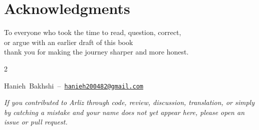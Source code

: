 \chapter*{Acknowledgments}
\thispagestyle{empty}

\vspace*{1cm}

\begin{center}
	\large
	To everyone who took the time to read, question, correct,\\
	or argue with an earlier draft of this book\\
	thank you for making the journey sharper and more honest.
\end{center}

\vspace{0.6cm}

\begingroup
\footnotesize
\setlength{\parindent}{0pt}
\setlength{\parskip}{0pt}
\setlength{\columnsep}{1.2em}

\begin{multicols}{2}
	\raggedright
	\raggedcolumns
	\newcommand{\AckEmail}[2]{\mbox{#1 -- \href{mailto:#2}{\texttt{#2}}}\par}
	\newcommand{\AckGitHub}[2]{\mbox{#1 -- \href{#2}{\texttt{#2}}}\par}
	\newcommand{\AckName}[1]{\mbox{#1}\par}
	
	\AckEmail{Hanieh Bakhshi}{hanieh200482@gmail.com}
	
\end{multicols}
\endgroup

\vfill

\begin{center}
	\small\textit{
		If you contributed to Arliz through code, review, discussion, translation,
		or simply by catching a mistake and your name does not yet appear here,
		please open an issue or pull request.
	}
\end{center}

\clearpage